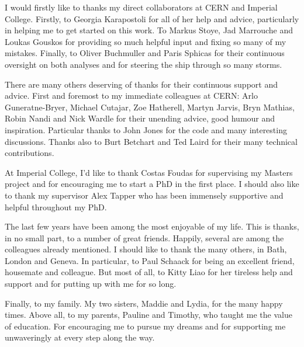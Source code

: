 \begin{acknowledgements}
  I would firstly like to thanks my direct collaborators at \ac{CERN} and
  Imperial College. Firstly, to Georgia Karapostoli for all of her help and
  advice, particularly in helping me to get started on this work. To Markus
  Stoye, Jad Marrouche and Loukas Gouskos for providing so much helpful input
  and fixing so many of my mistakes. Finally, to Oliver Buchmuller and Paris
  Sphicas for their continuous oversight on both analyses and for steering the
  ship through so many storms.

  There are many others deserving of thanks for their continuous support and
  advice. First and foremost to my immediate colleagues at \ac{CERN}: Arlo
  Guneratne-Bryer, Michael Cutajar, Zoe Hatherell, Martyn Jarvis, Bryn Mathias,
  Robin Nandi and Nick Wardle for their unending advice, good humour and
  inspiration. Particular thanks to John Jones for the  code and many
  interesting discussions. Thanks also to Burt Betchart and Ted Laird for their
  many technical contributions.

  At Imperial College, I'd like to thank Costas Foudas for supervising my
  Masters project and for encouraging me to start a PhD in the first place.  I
  should also like to thank my supervisor Alex Tapper who has been immensely
  supportive and helpful throughout my PhD.

  The last few years have been among the most enjoyable of my life. This is
  thanks, in no small part, to a number of great friends. Happily, several are
  among the colleagues already mentioned. I should like to thank the many
  others, in Bath, London and Geneva. In particular, to Paul Schaack for being
  an excellent friend, housemate and colleague. But most of all, to Kitty Liao
  for her tireless help and support and for putting up with me for so long.

  Finally, to my family. My two sisters, Maddie and Lydia, for the many happy
  times. Above all, to my parents, Pauline and Timothy, who taught me the value
  of education. For encouraging me to pursue my dreams and for supporting me
  unwaveringly at every step along the way.
\end{acknowledgements}




\tableofcontents

\listoffigures
\listoftables

